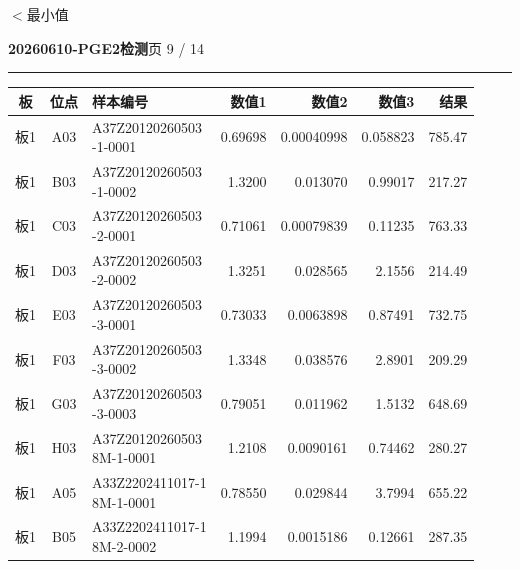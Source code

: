\documentclass[UTF8,10pt,a4paper,fontset=fandol]{ctexart}
\begin{document}
\noindent\hfill $<$最小值


\newpage

\begin{center}
\textbf{20260610-PGE2检测}\hfill \scriptsize 页 9 / 14
\end{center}
\hrule
\vspace{2pt}

\scriptsize
\begin{tabular}{@{}c c p{3.55cm} r r r r@{}}
板 & 位点 & 样本编号 & 数值1 & 数值2 & 数值3 & 结果\\
\hline
板1 & A03 & \shortstack[l]{A37Z20120260503\\-1-0001} & 0.69698 & 0.00040998 & 0.058823 & 785.47\\
板1 & B03 & \shortstack[l]{A37Z20120260503\\-1-0002} & 1.3200 & 0.013070 & 0.99017 & 217.27\\
板1 & C03 & \shortstack[l]{A37Z20120260503\\-2-0001} & 0.71061 & 0.00079839 & 0.11235 & 763.33\\
板1 & D03 & \shortstack[l]{A37Z20120260503\\-2-0002} & 1.3251 & 0.028565 & 2.1556 & 214.49\\
板1 & E03 & \shortstack[l]{A37Z20120260503\\-3-0001} & 0.73033 & 0.0063898 & 0.87491 & 732.75\\
板1 & F03 & \shortstack[l]{A37Z20120260503\\-3-0002} & 1.3348 & 0.038576 & 2.8901 & 209.29\\
板1 & G03 & \shortstack[l]{A37Z20120260503\\-3-0003} & 0.79051 & 0.011962 & 1.5132 & 648.69\\
板1 & H03 & \shortstack[l]{A37Z20120260503\\8M-1-0001} & 1.2108 & 0.0090161 & 0.74462 & 280.27\\
板1 & A05 & \shortstack[l]{A33Z2202411017-1\\8M-1-0001} & 0.78550 & 0.029844 & 3.7994 & 655.22\\
板1 & B05 & \shortstack[l]{A33Z2202411017-1\\8M-2-0002} & 1.1994 & 0.0015186 & 0.12661 & 287.35\\

\end{tabular}
\end{document}

